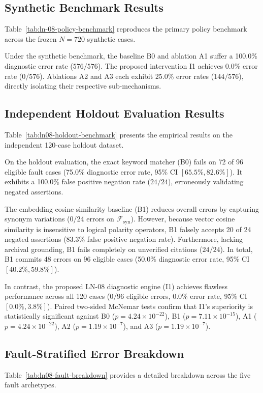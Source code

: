 \documentclass[11pt,a4paper]{article}
\begin{document}
\subsection{Synthetic Benchmark Results}
Table~\ref{tab:ln-08-policy-benchmark} reproduces the primary policy benchmark across the frozen $N=720$ synthetic cases.



Under the synthetic benchmark, the baseline B0 and ablation A1 suffer a 100.0\% diagnostic error rate ($576/576$). The proposed intervention I1 achieves 0.0\% error rate ($0/576$). Ablations A2 and A3 each exhibit 25.0\% error rates ($144/576$), directly isolating their respective sub-mechanisms.

\subsection{Independent Holdout Evaluation Results}
Table~\ref{tab:ln08-holdout-benchmark} presents the empirical results on the independent 120-case holdout dataset.



On the holdout evaluation, the exact keyword matcher (B0) fails on 72 of 96 eligible fault cases (75.0\% diagnostic error rate, 95\% CI $[65.5\%, 82.6\%]$). It exhibits a 100.0\% false positive negation rate ($24/24$), erroneously validating negated assertions.

The embedding cosine similarity baseline (B1) reduces overall errors by capturing synonym variations (0/24 errors on $\mathcal{F}_{\text{syn}}$). However, because vector cosine similarity is insensitive to logical polarity operators, B1 falsely accepts 20 of 24 negated assertions (83.3\% false positive negation rate). Furthermore, lacking archival grounding, B1 fails completely on unverified citations ($24/24$). In total, B1 commits 48 errors on 96 eligible cases (50.0\% diagnostic error rate, 95\% CI $[40.2\%, 59.8\%]$).

In contrast, the proposed LN-08 diagnostic engine (I1) achieves flawless performance across all 120 cases ($0/96$ eligible errors, 0.0\% error rate, 95\% CI $[0.0\%, 3.8\%]$). Paired two-sided McNemar tests confirm that I1's superiority is statistically significant against B0 ($p = 4.24 \times 10^{-22}$), B1 ($p = 7.11 \times 10^{-15}$), A1 ($p = 4.24 \times 10^{-22}$), A2 ($p = 1.19 \times 10^{-7}$), and A3 ($p = 1.19 \times 10^{-7}$).

\subsection{Fault-Stratified Error Breakdown}
Table~\ref{tab:ln08-fault-breakdown} provides a detailed breakdown across the five fault archetypes.
\end{document}
